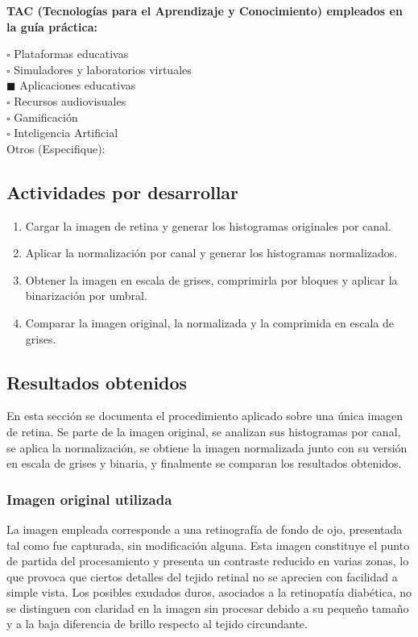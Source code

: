 \documentclass[11pt]{article}
\begin{document}
\textbf{TAC (Tecnologías para el Aprendizaje y Conocimiento) empleados en la guía práctica:}

$\square$ Plataformas educativas \\
$\square$ Simuladores y laboratorios virtuales \\
$\blacksquare$ Aplicaciones educativas \\
$\square$ Recursos audiovisuales \\
$\square$ Gamificación \\
$\square$ Inteligencia Artificial \\
Otros (Especifique): \underline{\hspace{5cm}}

\subsection{Actividades por desarrollar}
\begin{enumerate}
    \item Cargar la imagen de retina y generar los histogramas originales por canal.
    \item Aplicar la normalización por canal y generar los histogramas normalizados.
    \item Obtener la imagen en escala de grises, comprimirla por bloques y aplicar la binarización por umbral.
    \item Comparar la imagen original, la normalizada y la comprimida en escala de grises.
\end{enumerate}

\subsection{Resultados obtenidos}

En esta sección se documenta el procedimiento aplicado sobre una única imagen de retina. Se parte de la imagen original, se analizan sus histogramas por canal, se aplica la normalización, se obtiene la imagen normalizada junto con su versión en escala de grises y binaria, y finalmente se comparan los resultados obtenidos.

\subsubsection{Imagen original utilizada}

La imagen empleada corresponde a una retinografía de fondo de ojo, presentada tal como fue capturada, sin modificación alguna. Esta imagen constituye el punto de partida del procesamiento y presenta un contraste reducido en varias zonas, lo que provoca que ciertos detalles del tejido retinal no se aprecien con facilidad a simple vista. Los posibles exudados duros, asociados a la retinopatía diabética, no se distinguen con claridad en la imagen sin procesar debido a su pequeño tamaño y a la baja diferencia de brillo respecto al tejido circundante.
\end{document}
